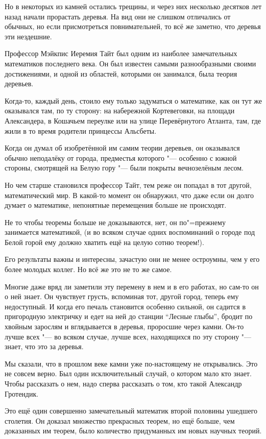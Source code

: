 Но в некоторых из камней остались трещины, и через них несколько десятков лет
назад начали прорастать деревья.
На вид они не слишком отличались от обычных, но если присмотреться
повнимательней, то всё же заметно, что деревья эти нездешние.

Профессор Мэйкпис Иеремия Тайт был одним из наиболее замечательных математиков
последнего века.
Он был известен самыми разнообразными своими достижениями, и одной из областей,
которыми он занимался, была теория деревьев.

Когда-то, каждый день, стоило ему только задуматься о математике, как он тут же
оказывался там, по ту сторону: на набережной Кортевеговки, на площади
Александера, в Кошачьем переулке или на улице Перевёрнутого Атланта, там, где
жили в то время родители принцессы Альсбеты.

Когда он думал об изобретённой им самим теории деревьев, он оказывался обычно
неподалёку от города, предместья которого "--- особенно с южной стороны,
смотрящей на Белую гору "--- были покрыты вечнозелёным лесом.

Но чем старше становился профессор Тайт, тем реже он попадал в тот другой,
математический мир.
В какой-то момент он обнаружил, что даже если он долго думает о математике,
непонятные перемещения больше не происходят.

Не то чтобы теоремы больше не доказываются, нет, он по"=прежнему занимается
математикой, (и во всяком случае одних воспоминаний о городе под Белой горой ему
должно хватить ещё на целую сотню теорем!).

Его результаты важны и интересны, зачастую они не менее остроумны, чем у его
более молодых коллег.
Но всё же это не то же самое.

Многие даже вряд ли заметили эту перемену в нем и в его работах, но сам-то он о
ней знает.
Он чувствует грусть, вспоминая тот, другой город, теперь ему недоступный.
И когда его печаль становится особенно сильной, он садится в пригородную
электричку и едет на ней до станции \enquote{Лесные глыбы}, бродит по хвойным
зарослям и вглядывается в деревья, проросшие через камни.
Он-то лучше всех "--- во всяком случае, лучше всех, находящихся по эту сторону
"--- знает, что это за деревья.

Мы сказали, что в прошлом веке камни уже по-настоящему не открывались.
Это не совсем верно.
Был один исключительный случай, о котором мало кто знает.
Чтобы рассказать о нем, надо сперва рассказать о том, кто такой Александр
Гротендик.

Это ещё один совершенно замечательный математик второй половины ушедшего
столетия.
Он доказал множество прекрасных теорем, но ещё больше, чем доказанных им теорем,
было количество придуманных им новых научных теорий.

